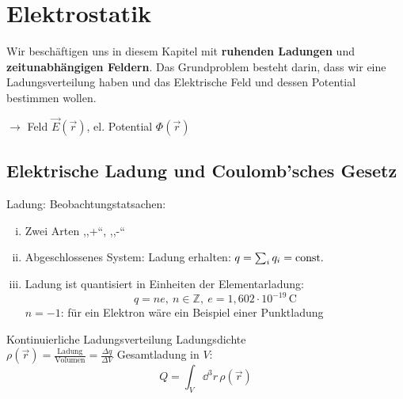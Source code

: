 \chapter{Elektrostatik}

Wir beschäftigen uns in diesem Kapitel mit \textbf{ruhenden Ladungen} und \textbf{zeitunabhängigen Feldern}. Das Grundproblem besteht darin, dass wir eine Ladungsverteilung haben und das Elektrische Feld und dessen Potential bestimmen wollen.\\[5pt]
\FloatBarrier
\begin{wrapfigure}{r}{3cm}
	\vspace{-1.2cm}
\end{wrapfigure}
\FloatBarrier
$\rightarrow$ Feld $\vec{E}(\vec{r})$, el. Potential $\Phi(\vec{r})$
\section{Elektrische Ladung und Coulomb'sches Gesetz}
Ladung: Beobachtungstatsachen:
\begin{enumerate}[i)]
	\item Zwei Arten ,,+``, ,,-``
	\item Abgeschlossenes System: Ladung erhalten: $q = \sum_i q_i = \textrm{const.}$
	\item Ladung ist quantisiert in Einheiten der Elementarladung: $$q = ne,\ n \in \mathbb{Z},\ e = 1,602\cdot 10^{-19}\,\textrm{C}$$ 
	$n = -1$: für ein Elektron wäre ein Beispiel einer Punktladung
\end{enumerate}

\noindent
\begin{minipage}{.6\linewidth}
	Kontinuierliche Ladungsverteilung Ladungsdichte\\
	$\rho(\vec{r}) = \frac{\textrm{Ladung}}{\textrm{Volumen}} = \frac{\Delta q}{\Delta V}$
	Gesamtladung in $V$: $$Q = \int_V \dd^3 r\, \rho(\vec{r})$$
\end{minipage}%
\begin{minipage}{.4\linewidth}
	\centering
\end{minipage}%

